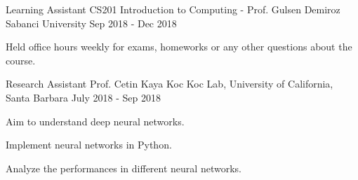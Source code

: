 

\begin{cventries}

  \cventry
    {Learning Assistant} %
    {CS201 Introduction to Computing - Prof. Gulsen Demiroz} %
    {Sabanci University} %
    {Sep 2018 - Dec 2018} %
    {
      \begin{cvitems} %
        \item {Held office hours weekly for exams, homeworks or any other questions about the course.}
      \end{cvitems}
    }

  \cventry
    {Research Assistant} %
    {Prof. Cetin Kaya Koc} %
    {Koc Lab, University of California, Santa Barbara} %
    { July 2018 - Sep 2018} %
    {
      \begin{cvitems} %
        \item {Aim to understand deep neural networks.}
        \item {Implement neural networks in Python.}
        \item {Analyze the performances in different neural networks.}
      \end{cvitems}
    }
\end{cventries}
